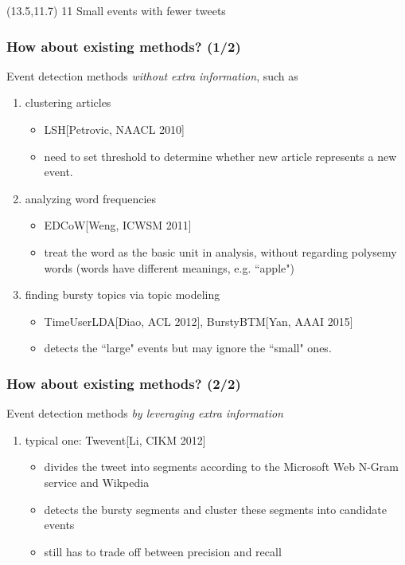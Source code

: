 \documentclass{beamer}
\begin{document}
\begin{frame}
 \begin{textblock}{0.1}(13.5,11.7)
  \footnotesize{11 Small events with fewer tweets}
 \end{textblock}

\end{frame}

\begin{frame}
\frametitle{How about existing methods? (1/2)}
Event detection methods \textit{without extra information}, such as
\begin{enumerate}
\item clustering articles
\begin{itemize}
	\item LSH[Petrovic, NAACL 2010]
	\item need to set threshold to determine whether new article represents a new event.
\end{itemize}
\item analyzing word frequencies
\begin{itemize}
	\item EDCoW[Weng, ICWSM 2011]
	\item treat the word as the basic unit in analysis, without regarding polysemy words (words have different meanings, e.g. ``apple")
\end{itemize}
\item finding bursty topics via topic modeling
\begin{itemize}
	\item TimeUserLDA[Diao, ACL 2012], BurstyBTM[Yan, AAAI 2015]
	\item detects the ``large" events but may ignore the ``small" ones. 
\end{itemize}
\end{enumerate}
\end{frame}

\begin{frame}
\frametitle{How about existing methods? (2/2)}
Event detection methods \textit{by leveraging extra information}
\begin{enumerate}
	\item typical one: Twevent[Li, CIKM 2012]
	\begin{itemize}
		\item divides the tweet into segments according to the Microsoft Web N-Gram service and Wikpedia
		\item detects the bursty segments and cluster these segments into candidate events
		\item still has to trade off between precision and recall
	\end{itemize}
\end{enumerate}
\end{frame}
\end{document}
